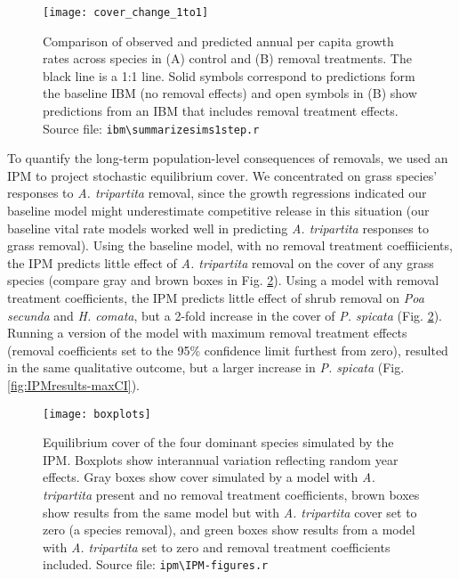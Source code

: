 \documentclass[11pt]{article}
\begin{document}
\begin{doublespacing}
  \begin{figure}[tbp]
  \centering
  \texttt{[image: cover\_change\_1to1]}
  \caption{Comparison of observed and predicted annual per capita growth rates across species in (A) control and (B) removal treatments. The black line is a 1:1 line. Solid symbols correspond to predictions form the baseline IBM (no removal effects) and open symbols in (B) show predictions from an IBM that includes removal treatment effects. Source file: \texttt{ibm\textbackslash summarize\textunderscore sims1step.r} }
  \label{fig:ObsPred1to1}
  \end{figure}

To quantify the long-term population-level consequences of removals, we used an IPM to project stochastic equilibrium cover. We concentrated on grass species' responses to \textit{A. tripartita} removal, since the growth regressions indicated our baseline model might underestimate competitive release in this situation (our baseline vital rate models worked well in predicting \textit{A. tripartita} responses to grass removal). Using the baseline model, with no removal treatment coeffiicients, the IPM predicts little effect of \textit{A. tripartita} removal on the cover of any grass species (compare gray and brown boxes in Fig. \ref{fig:IPMresults}). Using a model with removal treatment coefficients, the IPM predicts little effect of shrub removal on \textit{Poa secunda} and \textit{H. comata}, but a 2-fold increase in the cover of \textit{P. spicata} (Fig. \ref{fig:IPMresults}). Running a version of the model with maximum removal treatment effects (removal coefficients set to the 95\% confidence limit furthest from zero), resulted in the same qualitative outcome, but a larger increase in \textit{P. spicata} (Fig. \ref{fig:IPMresults-maxCI}). 

 \begin{figure}[tbp]
 \centering
 \texttt{[image: boxplots]}
 \caption{Equilibrium cover of the four dominant species simulated by the IPM. Boxplots show interannual variation reflecting random year effects. Gray boxes show cover simulated by a model with \textit{A. tripartita} present and no removal treatment coefficients, brown boxes show results from the same model but with \textit{A. tripartita} cover set to zero (a species removal), and green boxes show results from a model with  \textit{A. tripartita} set to zero and removal treatment coefficients included. Source file: \texttt{ipm\textbackslash IPM-figures.r}}
 \label{fig:IPMresults}
 \end{figure}
 

\end{doublespacing}
\end{document}
